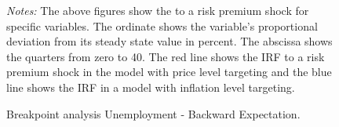 \documentclass[11pt, a4paper, leqno]{article}
\begin{document}
\begin{figure}[ht!]
	\caption{Breakpoint analysis Unemployment - Backward Expectation.}
	\label{fig:irf}
	\centering
    	\bigskip
	\begin{minipage}{\textwidth}%
		\footnotesize\setlength{\baselineskip}{11pt}%
		\bigskip \textit{Notes:} The above figures show the  to a risk premium shock for specific variables. The ordinate shows the variable's proportional deviation from its steady state value in percent. The abscissa shows the quarters from zero to 40. The red line shows the IRF to a risk premium shock in the model with price level targeting and the blue line shows the IRF in a model with inflation level targeting.
	\end{minipage}
\end{figure}
\end{document}
